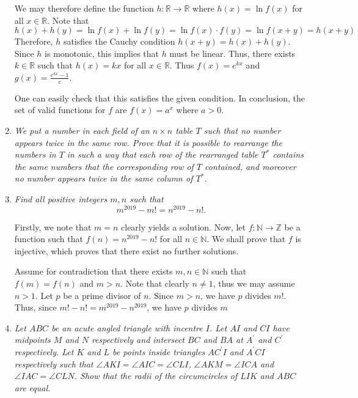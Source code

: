 \documentclass{article}
\begin{document}
\begin{enumerate}[1.]
We may therefore define the function $h : \mathbb{R} \to \mathbb{R}$ where $h(x) = \ln{f(x)}$ for all $x \in \mathbb{R}$. Note that
$$
h(x) + h(y) = \ln{f(x)} + \ln{f(y)} = \ln{f(x) \cdot f(y)} = \ln{f(x+y)} = h(x+y)
$$
Therefore, $h$ satisfies the Cauchy condition $h(x+y) = h(x) + h(y)$. Since $h$ is monotonic, this implies that $h$ must be linear. Thus, there exists $k \in \mathbb{R}$ such that $h(x) = kx$ for all $x \in \mathbb{R}$.  Thus $f(x) = e^{kx}$ and $g(x) = \frac{e^{kx} - 1}{c}$.

One can easily check that this satisfies the given condition.  In conclusion, the set of valid functions for $f$ are $f(x) = a^x$ where $a > 0$.




\vspace{6pt}
\item %
{\itshape We put a number in each field of an $n \times n$ table $T$ such that no number appears twice in the same row. Prove that it is possible to rearrange the numbers in $T$ in such a way that each row of the rearranged table $T^*$ contains the same numbers that the corresponding row of $T$ contained, and moreover no number appears twice in the same column of $T^*$.
}

\vspace{6pt}
\item %
{\itshape Find all positive integers $m, n$ such that
\[ m^{2019} - m! = n^{2019} - n! . \]}

Firstly, we note that $m = n$ clearly yields a solution.  Now, let $f : \mathbb{N} \to \mathbb{Z}$ be a function such that $f(n) = n^{2019} - n!$ for all $n \in \mathbb{N}$. We shall prove that $f$ is injective, which proves that there exist no further solutions.

Assume for contradiction that there exists $m, n \in \mathbb{N}$ such that $f(m) = f(n)$ and $m > n$.  Note that clearly $n \not = 1$, thus we may assume $n > 1$.  Let $p$ be a prime divisor of $n$. Since $m > n$, we have $p$ divides $m!$.  Thus, since $m! - n! = m^{2019} - n^{2019}$, we have $p$ divides $m$


\vspace{6pt}
\item %
{\itshape Let $ABC$ be an acute angled triangle with incentre $I$. Let $AI$ and $CI$ have midpoints $M$ and $N$ respectively and intersect $BC$ and $BA$ at $A^\prime$ and $C^\prime$ respectively. Let $K$ and $L$ be points inside triangles $AC^\prime I$ and $A^\prime CI$ respectively such that $\angle AKI = \angle AIC = \angle CLI$, $\angle AKM = \angle ICA$ and $\angle IAC = \angle CLN$. Show that the radii of the circumcircles of $LIK$ and $ABC$ are equal.
}

  
\end{enumerate}
\end{document}
